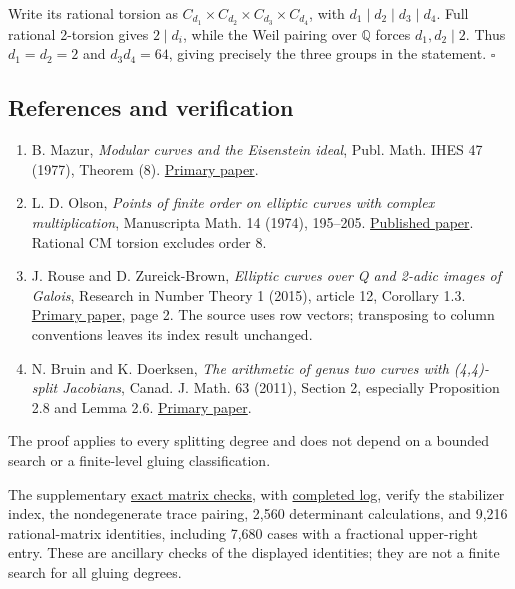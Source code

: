 \documentclass[
  11pt,
]{article}
\providecommand{\tightlist}{%
  \setlength{\itemsep}{0pt}\setlength{\parskip}{0pt}}
\begin{document}
Write its rational torsion as
\(C_{d_1}\times C_{d_2}\times C_{d_3}\times C_{d_4}\), with
\(d_1\mid d_2\mid d_3\mid d_4\). Full rational 2-torsion gives
\(2\mid d_i\), while the Weil pairing over \(\mathbb Q\) forces
\(d_1,d_2\mid2\). Thus \(d_1=d_2=2\) and \(d_3d_4=64\), giving precisely
the three groups in the statement. \(\square\)

\subsection{References and
verification}\label{references-and-verification}

\begin{enumerate}
\def\labelenumi{\arabic{enumi}.}
\tightlist
\item
  B. Mazur, \emph{Modular curves and the Eisenstein ideal}, Publ. Math.
  IHES 47 (1977), Theorem (8).
  \href{https://www.numdam.org/item/PMIHES_1977__47__33_0/}{Primary
  paper}.
\item
  L. D. Olson, \emph{Points of finite order on elliptic curves with
  complex multiplication}, Manuscripta Math. 14 (1974), 195--205.
  \href{https://doi.org/10.1007/BF01171442}{Published paper}. Rational
  CM torsion excludes order 8.
\item
  J. Rouse and D. Zureick-Brown, \emph{Elliptic curves over Q and 2-adic
  images of Galois}, Research in Number Theory 1 (2015), article 12,
  Corollary 1.3. \href{https://arxiv.org/pdf/1402.5997}{Primary paper},
  page 2. The source uses row vectors; transposing to column conventions
  leaves its index result unchanged.
\item
  N. Bruin and K. Doerksen, \emph{The arithmetic of genus two curves
  with (4,4)-split Jacobians}, Canad. J. Math. 63 (2011), Section 2,
  especially Proposition 2.8 and Lemma 2.6.
  \href{https://arxiv.org/pdf/0902.3480}{Primary paper}.
\end{enumerate}

The proof applies to every splitting degree and does not depend on a
bounded search or a finite-level gluing classification.

The supplementary
\href{https://genus-2-torsion.github.io/data/knowledge/sources/qsplit_order256_matrix_checks.py}{exact
matrix checks}, with
\href{https://genus-2-torsion.github.io/data/knowledge/sources/qsplit_order256_matrix_checks.log}{completed
log}, verify the stabilizer index, the nondegenerate trace pairing,
2,560 determinant calculations, and 9,216 rational-matrix identities,
including 7,680 cases with a fractional upper-right entry. These are
ancillary checks of the displayed identities; they are not a finite
search for all gluing degrees.
\end{document}
